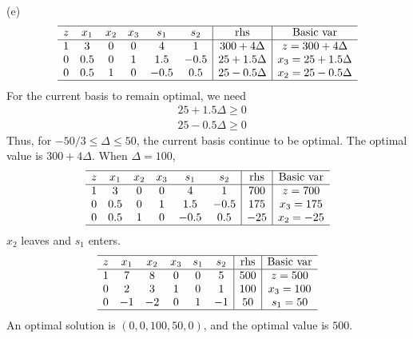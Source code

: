 \documentclass[12pt]{article}
\begin{document}
(e)
\begin{equation*}
  \begin{array}{cccccc|c|c}
    \hline
    z &  x_1      &  x_2 &  x_3 &  s_1 & s_2 &   \text{rhs} & \text{Basic var}   \\ \hline
    1 &    3     &    0 &    0 &    4 & 1    & 300+4\Delta       &  z=300+4\Delta              \\
    0 &    0.5      &    0 &    1 &    1.5 &    -0.5 & 25+1.5\Delta        &  x_3 = 25+1.5\Delta         \\
    0 &    0.5      &    1 &    0 &    -0.5 &    0.5 & 25-0.5\Delta        &  x_2 = 25-0.5\Delta           \\ \hline
  \end{array}
\end{equation*}
For the current basis to remain optimal, we need
\begin{align*}
    & 25+1.5\Delta \ge 0 \\
    & 25-0.5\Delta \ge 0
\end{align*}
Thus, for $-50/3 \le \Delta \le 50$, the current basis continue to be optimal. The optimal value is $300+4\Delta$. When $\Delta = 100$,
\begin{equation*}
  \begin{array}{cccccc|c|c}
    \hline
    z &  x_1      &  x_2 &  x_3 &  s_1 & s_2 &   \text{rhs} & \text{Basic var}   \\ \hline
    1 &    3     &    0 &    0 &    4 & 1    & 700       &  z=700              \\
    0 &    0.5      &    0 &    1 &    1.5 &    -0.5 & 175        &  x_3 = 175         \\
    0 &    0.5      &    1 &    0 &    -0.5 &    0.5 & -25        &  x_2 = -25           \\ \hline
  \end{array}
\end{equation*}
$x_2$ leaves and $s_1$ enters.
\begin{equation*}
  \begin{array}{cccccc|c|c}
    \hline
    z &  x_1      &  x_2 &  x_3 &  s_1 & s_2 &   \text{rhs} & \text{Basic var}   \\ \hline
    1 &    7     &    8 &    0 &    0 & 5    & 500       &  z=500              \\
    0 &    2      &    3 &    1 &    0 &    1 & 100        &  x_3 = 100         \\
    0 &    -1      &    -2 &    0 &    1 &    -1 & 50        &  s_1 = 50           \\ \hline
  \end{array}
\end{equation*}
An optimal solution is $(0,0,100,50,0)$, and the optimal value is $500$.
\end{document}
